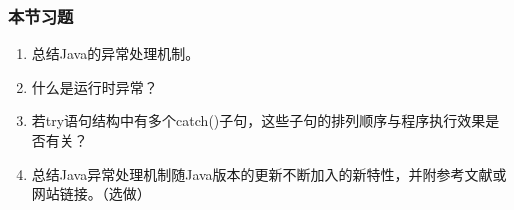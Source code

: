 \begin{frame}
  \frametitle{本节习题}
  \begin{enumerate}
  \item 总结Java的异常处理机制。
  \item 什么是运行时异常？
  \item 若try语句结构中有多个catch()子句，这些子句的排列顺序与程序执行效果是否有关？
  \item 总结Java异常处理机制随Java版本的更新不断加入的新特性，并附参考文献或网站链接。（选做）
  \end{enumerate}
\end{frame}


